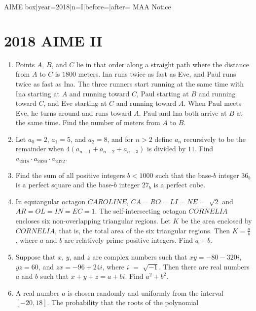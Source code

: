\documentclass{article}
\begin{document}
\begin{enumerate}[label=\arabic*., itemsep=0.5em]
{{AIME box|year=2018|n=I|before=|after=}}
{{MAA Notice}}\par \vspace{0.5em}\end{enumerate}\newpage\section*{2018 AIME II}\begin{enumerate}[label=\arabic*., itemsep=0.5em]\item Points $A$, $B$, and $C$ lie in that order along a straight path where the distance from $A$ to $C$ is $1800$ meters. Ina runs twice as fast as Eve, and Paul runs twice as fast as Ina. The three runners start running at the same time with Ina starting at $A$ and running toward $C$, Paul starting at $B$ and running toward $C$, and Eve starting at $C$ and running toward $A$. When Paul meets Eve, he turns around and runs toward $A$. Paul and Ina both arrive at $B$ at the same time. Find the number of meters from $A$ to $B$.\par \vspace{0.5em}\item Let $a_{0} = 2$, $a_{1} = 5$, and $a_{2} = 8$, and for $n > 2$ define $a_{n}$ recursively to be the remainder when $4(a_{n-1} + a_{n-2} + a_{n-3})$ is divided by $11$. Find $a_{2018} \cdot a_{2020} \cdot a_{2022}$.\par \vspace{0.5em}\item Find the sum of all positive integers $b < 1000$ such that the base-$b$ integer $36_{b}$ is a perfect square and the base-$b$ integer $27_{b}$ is a perfect cube.\par \vspace{0.5em}\item In equiangular octagon $CAROLINE$, $CA = RO = LI = NE =$ $\sqrt{2}$ and $AR = OL = IN = EC = 1$. The self-intersecting octagon $CORNELIA$ encloses six non-overlapping triangular regions. Let $K$ be the area enclosed by $CORNELIA$, that is, the total area of the six triangular regions. Then $K = \frac{a}{b}$, where $a$ and $b$ are relatively prime positive integers. Find $a + b$.\par \vspace{0.5em}\item Suppose that $x$, $y$, and $z$ are complex numbers such that $xy = -80 - 320i$, $yz = 60$, and $zx = -96 + 24i$, where $i$ $=$ $\sqrt{-1}$. Then there are real numbers $a$ and $b$ such that $x + y + z = a + bi$. Find $a^2 + b^2$.\par \vspace{0.5em}\item A real number $a$ is chosen randomly and uniformly from the interval $[-20, 18]$. The probability that the roots of the polynomial



\end{enumerate}
\end{document}
